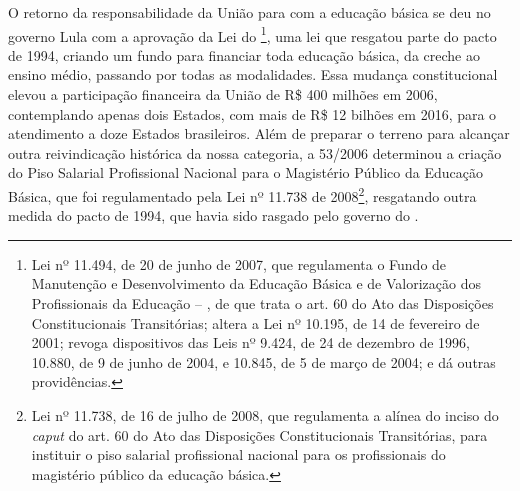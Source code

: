 O retorno da responsabilidade da União para com a educação básica se deu
no governo Lula com a aprovação da Lei do \footnote{Lei nº
  11.494, de 20 de junho de 2007, que regulamenta o Fundo de Manutenção e
  Desenvolvimento da Educação Básica e de Valorização dos Profissionais
  da Educação -- , de que trata o art. 60 do Ato das Disposições
  Constitucionais Transitórias; altera a Lei nº
  10.195, de 14 de fevereiro de 2001; revoga dispositivos das Leis
  nº 9.424, de 24 de dezembro de 1996, 10.880,
  de 9 de junho de 2004, e 10.845, de 5 de março de 2004; e dá outras
  providências.}, uma lei que resgatou parte do pacto de 1994, criando
um fundo para financiar toda educação básica, da creche ao ensino médio,
passando por todas as modalidades. Essa mudança constitucional elevou a
participação financeira da União de R\$ 400 milhões em 2006,
contemplando apenas dois Estados, com mais de R\$ 12 bilhões em 2016,
para o atendimento a doze Estados brasileiros. Além de preparar o
terreno para alcançar outra reivindicação histórica da nossa categoria,
a  53/2006 determinou a criação do Piso Salarial Profissional Nacional
para o Magistério Público da Educação Básica, que foi regulamentado pela
Lei nº 11.738 de 2008\footnote{Lei nº 11.738, de 16 de
  julho de 2008, que regulamenta a alínea  do inciso  do \emph{caput} do art.
  60 do Ato das Disposições Constitucionais Transitórias, para instituir
  o piso salarial profissional nacional para os profissionais do
  magistério público da educação
  básica.},
resgatando outra medida do pacto de 1994, que havia sido rasgado pelo
governo do .

